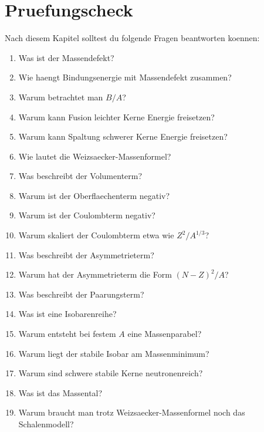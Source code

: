 \section{Pruefungscheck}

\begin{examtipbox}
Nach diesem Kapitel solltest du folgende Fragen beantworten koennen:
\begin{enumerate}
    \item Was ist der Massendefekt?
    \item Wie haengt Bindungsenergie mit Massendefekt zusammen?
    \item Warum betrachtet man $B/A$?
    \item Warum kann Fusion leichter Kerne Energie freisetzen?
    \item Warum kann Spaltung schwerer Kerne Energie freisetzen?
    \item Wie lautet die Weizsaecker-Massenformel?
    \item Was beschreibt der Volumenterm?
    \item Warum ist der Oberflaechenterm negativ?
    \item Warum ist der Coulombterm negativ?
    \item Warum skaliert der Coulombterm etwa wie $Z^2/A^{1/3}$?
    \item Was beschreibt der Asymmetrieterm?
    \item Warum hat der Asymmetrieterm die Form $(N-Z)^2/A$?
    \item Was beschreibt der Paarungsterm?
    \item Was ist eine Isobarenreihe?
    \item Warum entsteht bei festem $A$ eine Massenparabel?
    \item Warum liegt der stabile Isobar am Massenminimum?
    \item Warum sind schwere stabile Kerne neutronenreich?
    \item Was ist das Massental?
    \item Warum braucht man trotz Weizsaecker-Massenformel noch das Schalenmodell?
\end{enumerate}
\end{examtipbox}
